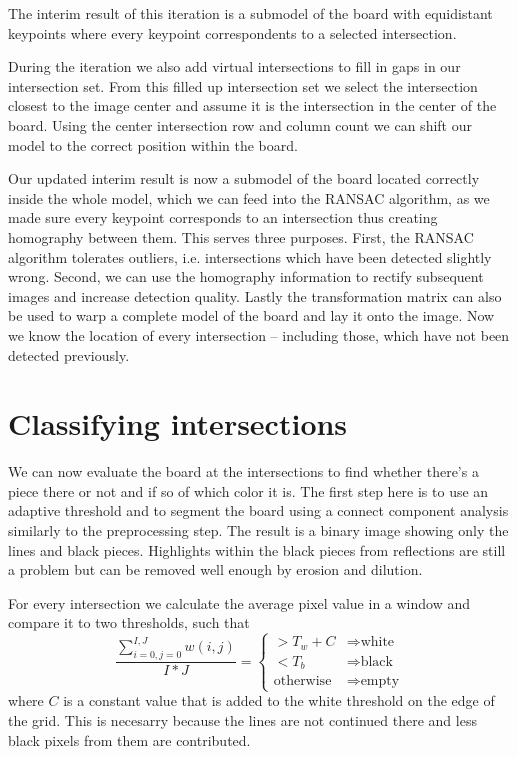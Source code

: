	The interim result of this iteration is a submodel of the board with equidistant keypoints where every keypoint correspondents to a selected intersection.

	During the iteration we also add virtual intersections to fill in gaps in our intersection set. From this filled up intersection set we select the intersection closest to the image center and assume it is the intersection in the center of the board. Using the center intersection row and column count we can shift our model to the correct position within the board.

	Our updated interim result is now a submodel of the board located correctly inside the whole model, which we can feed into the RANSAC algorithm, as we made sure every keypoint corresponds to an intersection thus creating homography between them. This serves three purposes. First, the RANSAC algorithm tolerates outliers, i.e. intersections which have been detected slightly wrong. Second, we can use the homography information to rectify subsequent images and increase detection quality. Lastly the transformation matrix can also be used to warp a complete model of the board and lay it onto the image. Now we know the location of every intersection -- including those, which have not been detected previously.

	\section{Classifying intersections}
	We can now evaluate the board at the intersections to find whether there's a piece there or not and if so of which color it is. The first step here is to use an adaptive threshold and to segment the board using a connect component analysis similarly to the preprocessing step. The result is a binary image showing only the lines and black pieces. Highlights within the black pieces from reflections are still a problem but can be removed well enough by erosion and dilution.

	For every intersection we calculate the average pixel value in a window and compare it to two thresholds, such that \begin{equation}
		\frac{\sum^{I,J}_{i=0,j=0}w(i,j)}{I*J} =
		\begin{cases}
		> T_{w} + C & \Rightarrow  \text{white}\\
		< T_{b} & \Rightarrow \text{black}\\
		\text{otherwise} & \Rightarrow \text{empty}
		\end{cases}
	\end{equation}
	where $C$ is a constant value that is added to the white threshold on the edge of the grid. This is necesarry because the lines are not continued there and less black pixels from them are contributed.
